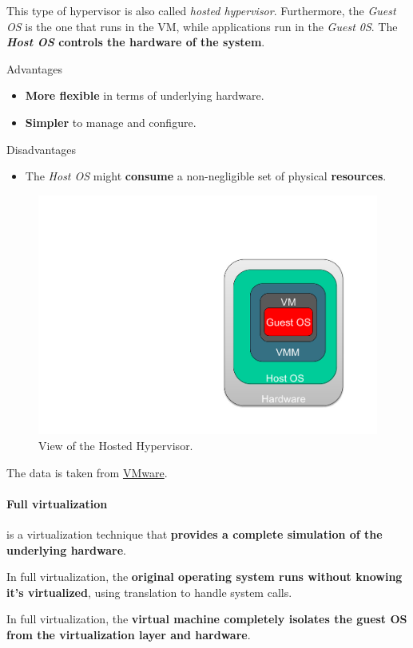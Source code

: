 \begin{itemize}
	This type of hypervisor is also called \emph{hosted hypervisor}. Furthermore, the \emph{Guest OS} is the one that runs in the VM, while applications run in the \emph{Guest 0S}. The \textbf{\emph{Host OS} controls the hardware of the system}.
	\begin{flushleft}
		\textcolor{Green3}{ Advantages}
	\end{flushleft}
	\begin{itemize}
		\item \textbf{More flexible} in terms of underlying hardware.
		\item \textbf{Simpler} to manage and configure.
	\end{itemize}
	\begin{flushleft}
		\textcolor{Red2}{ Disadvantages}
	\end{flushleft}
	\begin{itemize}
		\item The \emph{Host OS} might \textbf{consume} a non-negligible set of physical \textbf{resources}.
	\end{itemize}
	\begin{figure}[!htp]
		\centering
		\includegraphics[width=.3\textwidth]{img/vm-7.pdf}
		\caption{View of the Hosted Hypervisor.}
	\end{figure}
\end{itemize}
The data is taken from \href{https://www.vmware.com/topics/bare-metal-hypervisor}{VMware}.

\newpage

\paragraph{Full virtualization}

 is a virtualization technique that \textbf{provides a complete simulation of the underlying hardware}.

\highspace
In full virtualization, the \textbf{original operating system runs without knowing it's virtualized}, using translation to handle system calls.

\highspace
In full virtualization, the \textbf{virtual machine completely isolates the guest OS from the virtualization layer and hardware}.


